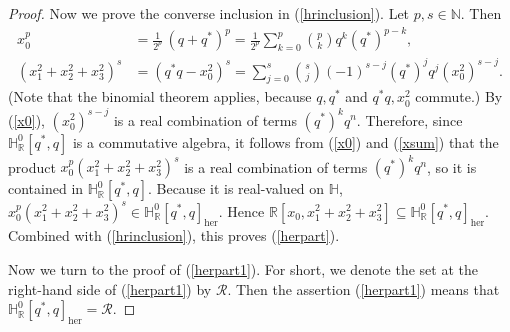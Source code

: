 \documentclass[10pt,a4paper]{amsart}
\begin{document}
\begin{proof}
Now we prove the converse inclusion in (\ref{hrinclusion}). Let
$p,s\in \mathbb{N}$. Then
%
\begin{align}
x_{0}^{p} & = \frac{1}{2^{p}}\, (q+q^{*})^{p} = \frac{1}{2^{p}} \sum _{k=0}^{p}
\binom{p}{k} q^{k} (q^{*})^{p-k},
\label{x0}
\\
(x_{1}^{2}+x_{2}^{2}+x_{3}^{2})^{s} & = (q^{*}q - x_{0}^{2})^{s} =
\sum _{j=0}^{s} \binom{s}{j} (-1)^{s-j} (q^{*})^{j} q^{j} (x_{0}^{2})^{s-j}.
\label{xsum}
\end{align}
%
(Note that the binomial theorem applies, because $q,q^{*}$ and
$q^{*}q, x_{0}^{2}$ commute.) By (\ref{x0}), $(x_{0}^{2})^{s-j}$ is a real
combination of terms $(q^{*})^{k}q^{n}$. Therefore, since
$\mathbb{H}^{0}_{\mathbb R}[q^{*}, q]$ is a commutative algebra, it follows
from (\ref{x0}) and (\ref{xsum}) that the product
$x_{0}^{p}(x_{1}^{2}+x_{2}^{2}+x_{3}^{2})^{s}$ is a real combination of
terms $(q^{*})^{k}q^{n}$, so it is contained in
$ \mathbb{H}^{0}_{\mathbb{R}}[q^{*}, q]$. Because it is real-valued on
$\mathbb{H}$,
$x_{0}^{p}(x_{1}^{2}+x_{2}^{2}+x_{3}^{2})^{s} \in \mathbb{H}^{0}_{
\mathbb R}[q^{*}, q]_{\mathrm{her}}$. Hence
$ \mathbb{R}[x_{0},x_{1}^{2}+x_{2}^{2}+x_{3}^{2}]\subseteq \mathbb{H}^{0}_{
\mathbb R}[q^{*}, q]_{\mathrm{her}} $. Combined with (\ref{hrinclusion}),
this proves (\ref{herpart}).

Now we turn to the proof of (\ref{herpart1}). For short, we denote the
set at the right-hand side of (\ref{herpart1}) by $\mathcal{R}$. Then the
assertion (\ref{herpart1}) means that
$ \mathbb{H}^{0}_{\mathbb R}[q^{*}, q]_{\mathrm{her}}=\mathcal{R}$.


\end{proof}
\end{document}
